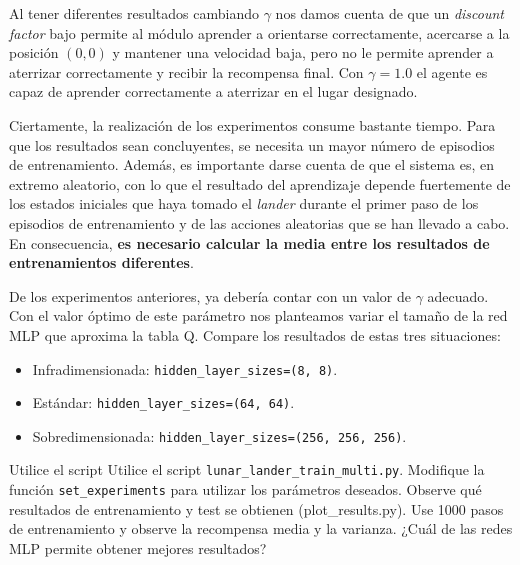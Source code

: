 \documentclass{article}
\begin{document}
Al tener diferentes resultados cambiando $\gamma$ nos damos cuenta de que un \textit{discount factor} bajo permite al módulo aprender a orientarse correctamente, acercarse a la posición $(0,0)$ y mantener una velocidad baja, pero no le permite aprender a aterrizar correctamente y recibir la recompensa final. Con $\gamma=1.0$ el agente es capaz de aprender correctamente a aterrizar en el lugar designado.

Ciertamente, la realización de los experimentos consume bastante tiempo. Para que los resultados sean concluyentes, se necesita un mayor número de episodios de entrenamiento. Además, es importante darse cuenta de que el sistema es, en extremo aleatorio, con lo que el resultado del aprendizaje depende fuertemente de los estados iniciales que haya tomado el \textit{lander} durante el primer paso de los episodios de entrenamiento y de las acciones aleatorias que se han llevado a cabo. En consecuencia, \textbf{es necesario calcular la media entre los resultados de entrenamientos diferentes}.





\begin{exercise}
De los experimentos anteriores, ya debería contar con un valor de $\gamma$ adecuado. Con el valor óptimo de este parámetro nos planteamos variar el tamaño de la red MLP que aproxima la tabla Q. Compare los resultados de estas tres situaciones:
\begin{itemize}
    \item Infradimensionada: \texttt{hidden\_layer\_sizes=(8, 8)}.
\item Estándar: \texttt{hidden\_layer\_sizes=(64, 64)}.
\item Sobredimensionada: \texttt{hidden\_layer\_sizes=(256, 256, 256)}.
\end{itemize}

Utilice el script Utilice el script \texttt{lunar\_lander\_train\_multi.py}. Modifique la función \texttt{set\_experiments} para utilizar los parámetros deseados. Observe qué resultados de entrenamiento y test se obtienen (plot\_results.py). Use 1000 pasos de entrenamiento y observe la recompensa media y la varianza. ¿Cuál de las redes MLP permite obtener mejores resultados?
\end{exercise}


\end{document}
